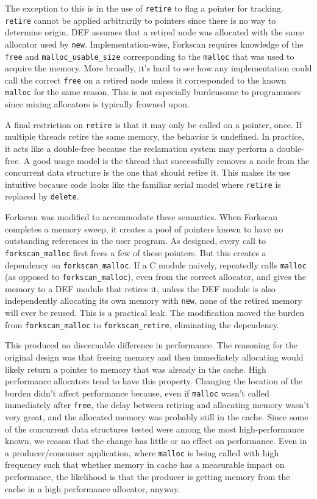 The exception to this is in the use of \texttt{retire} to flag a pointer for tracking.  \texttt{retire} cannot be applied arbitrarily to pointers since there is no way to determine origin.  DEF assumes that a retired node was allocated with the same allocator used by \texttt{new}.  Implementation-wise, Forkscan requires knowledge of the \texttt{free} and \texttt{malloc\_{}usable\_{}size} corresponding to the \texttt{malloc} that was used to acquire the memory.  More broadly, it's hard to see how any implementation could call the correct \texttt{free} on a retired node unless it corresponded to the known \texttt{malloc} for the same reason.  This is not especially burdensome to programmers since mixing allocators is typically frowned upon.

A final restriction on \texttt{retire} is that it may only be called on a pointer, once.  If multiple threads retire the same memory, the behavior is undefined.  In practice, it acts like a double-free because the reclamation system may perform a double-free.  A good usage model is the thread that successfully removes a node from the concurrent data structure is the one that should retire it.  This makes its use intuitive because code looks like the familiar serial model where \texttt{retire} is replaced by \texttt{delete}.

Forkscan was modified to accommodate these semantics.  When Forkscan completes a memory sweep, it creates a pool of pointers known to have no outstanding references in the user program.  As designed, every call to \texttt{forkscan\_{}malloc} first frees a few of these pointers.  But this creates a dependency on \texttt{forkscan\_{}malloc}.  If a C module naively, repeatedly calls \texttt{malloc} (as opposed to \texttt{forkscan\_{}malloc}), even from the correct allocator, and gives the memory to a DEF module that retires it, unless the DEF module is also independently allocating its own memory with \texttt{new}, none of the retired memory will ever be reused.  This is a practical leak.  The modification moved the burden from \texttt{forkscan\_{}malloc} to \texttt{forkscan\_retire}, eliminating the dependency.

This produced no discernable difference in performance.  The reasoning for the original design was that freeing memory and then immediately allocating would likely return a pointer to memory that was already in the cache.  High performance allocators tend to have this property.  Changing the location of the burden didn't affect performance because, even if \texttt{malloc} wasn't called immediately after \texttt{free}, the delay between retiring and allocating memory wasn't very great, and the allocated memory was probably still in the cache.  Since some of the concurrent data structures tested were among the most high-performance known, we reason that the change has little or no effect on performance.  Even in a producer/consumer application, where \texttt{malloc} is being called with high frequency such that whether memory in cache has a measurable impact on performance, the likelihood is that the producer is getting memory from the cache in a high performance allocator, anyway.

